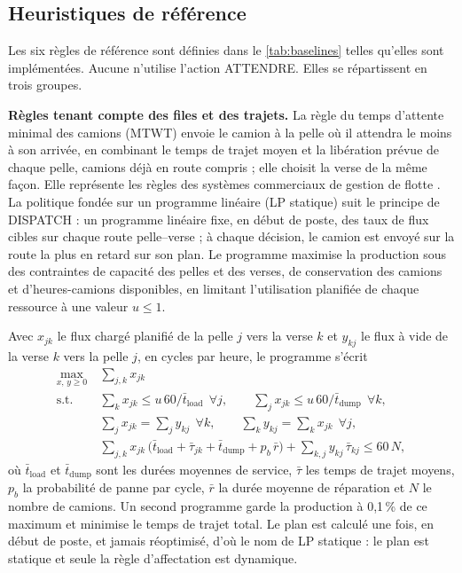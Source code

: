\documentclass[11pt,a4paper]{article}
\newif\ifrevmarks
\newcommand{\revtag}[1]{\ifrevmarks\textsuperscript{\textcolor{red!70!black}{\scriptsize[#1]}}\fi}
\newenvironment{revbloc}[1]{\par\ifrevmarks\color{revcolor}\noindent\revtag{#1}\ \fi}{\par}
\newif\ifcorrmarks
\newcommand{\corr}[1]{\ifcorrmarks\textcolor{corrcolor}{#1}\else#1\fi}
\newenvironment{corrbloc}{\par\ifcorrmarks\color{corrcolor}\fi}{\par}
\begin{document}
\subsection{Heuristiques de référence}
\label{sec:baselines-def}

\begin{revbloc}{M25, M16, Dir. corr. 1, A, v3}
Les six règles de référence sont définies dans le \cref{tab:baselines} telles qu'elles sont implémentées. Aucune n'utilise l'action ATTENDRE. Elles se répartissent en trois groupes.

\textbf{Règles tenant compte des files et des trajets.} La règle du temps d'attente minimal des camions (MTWT) envoie le camion à la pelle où il attendra le moins à son arrivée, en combinant le temps de trajet moyen et la libération prévue de chaque pelle, camions déjà en route compris ; elle choisit la verse de la même façon. Elle représente les règles des systèmes commerciaux de gestion de flotte \cite{Zeng2022}. La politique fondée sur un programme linéaire (\corr{LP statique}) suit le principe de DISPATCH \cite{Soumis1989} : un programme linéaire fixe, en début de poste, des taux de flux cibles sur chaque route pelle--verse ; à chaque décision, le camion est envoyé sur la route la plus en retard sur son plan. Le programme maximise la production sous des contraintes de capacité des pelles et des verses, de conservation des camions et d'heures-camions disponibles, en limitant l'utilisation planifiée de chaque ressource à une valeur $u \leq 1$.
\begin{corrbloc}
Avec $x_{jk}$ le flux chargé planifié de la pelle $j$ vers la verse $k$ et $y_{kj}$ le flux à vide de la verse $k$ vers la pelle $j$, en cycles par heure, le programme s'écrit
\begin{align}
\max_{x,\,y \ge 0}\ & \textstyle\sum_{j,k} x_{jk} \label{eq:lp}\\
\text{s.t.}\ & \textstyle\sum_k x_{jk} \le u\,60/\bar t_{\mathrm{load}} \ \ \forall j, \qquad \sum_j x_{jk} \le u\,60/\bar t_{\mathrm{dump}} \ \ \forall k, \nonumber\\
& \textstyle\sum_j x_{jk} = \sum_j y_{kj} \ \ \forall k, \qquad \sum_k y_{kj} = \sum_k x_{jk} \ \ \forall j, \nonumber\\
& \textstyle\sum_{j,k} x_{jk}\,\big(\bar t_{\mathrm{load}} + \bar\tau_{jk} + \bar t_{\mathrm{dump}} + p_b\,\bar r\big) + \sum_{k,j} y_{kj}\,\bar\tau_{kj} \le 60\,N, \nonumber
\end{align}
où $\bar t_{\mathrm{load}}$ et $\bar t_{\mathrm{dump}}$ sont les durées moyennes de service, $\bar\tau$ les temps de trajet moyens, $p_b$ la probabilité de panne par cycle, $\bar r$ la durée moyenne de réparation et $N$ le nombre de camions. Un second programme garde la production à 0,1\,\% de ce maximum et minimise le temps de trajet total. Le plan est calculé une fois, en début de poste, et jamais réoptimisé, d'où le nom de \corr{LP statique} : le plan est statique et seule la règle d'affectation est dynamique.

\end{corrbloc}
\end{revbloc}
\end{document}
